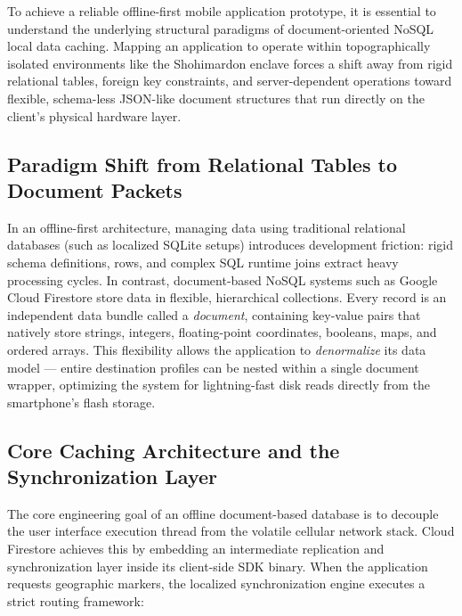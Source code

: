 \documentclass[12pt,a4paper,oneside]{report}
\begin{document}
To achieve a reliable offline-first mobile application prototype, it is essential to
understand the underlying structural paradigms of document-oriented NoSQL local data
caching. Mapping an application to operate within topographically isolated environments
like the Shohimardon enclave forces a shift away from rigid relational tables, foreign key
constraints, and server-dependent operations toward flexible, schema-less JSON-like
document structures that run directly on the client's physical hardware layer.

\subsection{Paradigm Shift from Relational Tables to Document Packets}

In an offline-first architecture, managing data using traditional relational databases
(such as localized SQLite setups) introduces development friction: rigid schema
definitions, rows, and complex SQL runtime joins extract heavy processing cycles. In
contrast, document-based NoSQL systems such as Google Cloud Firestore store data in
flexible, hierarchical collections. Every record is an independent data bundle called a
\emph{document}, containing key-value pairs that natively store strings, integers,
floating-point coordinates, booleans, maps, and ordered arrays. This flexibility allows
the application to \emph{denormalize} its data model --- entire destination profiles can
be nested within a single document wrapper, optimizing the system for lightning-fast disk
reads directly from the smartphone's flash storage.

\subsection{Core Caching Architecture and the Synchronization Layer}

The core engineering goal of an offline document-based database is to decouple the user
interface execution thread from the volatile cellular network stack. Cloud Firestore
achieves this by embedding an intermediate replication and synchronization layer inside
its client-side SDK binary. When the application requests geographic markers, the
localized synchronization engine executes a strict routing framework:
\end{document}
